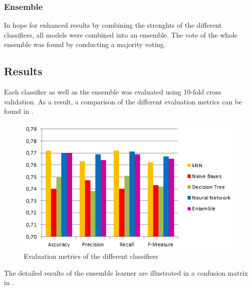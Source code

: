 \subsubsection*{Ensemble}
In hope for enhanced results by combining the strenghts of the
different classifiers, all models were combined into an ensemble. The
vote of the whole ensemble was found by conducting a majority voting.

\subsection{Results}
Each classifier as well as the ensemble was evaluated using 10-fold
cross validation.
As a result, a comparison of the different evaluation metrics can
be found in .

\begin{figure}[h]
	\centering
	\includegraphics[width=\columnwidth]{../../charts/results.png}
	\caption{Evaluation metrics of the different classifiers}
	\label{fig:result}
\end{figure}

\noindent The detailed results of the ensemble learner are illustrated in a
confusion matrix in .

\begin{table}[h]
	\centering
	\caption{Confusion matrix of the ensemble}
	\label{tab:mat-vote}
\end{table}

